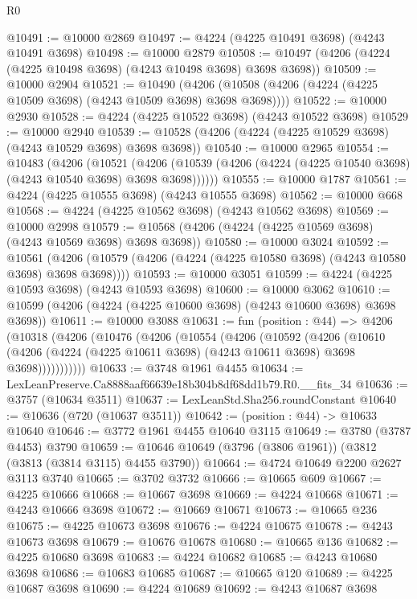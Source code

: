 \begin{lexlean}{R0}
\begin{coremodule}
@10491 := @10000 @2869
@10497 := @4224 (@4225 @10491 @3698) (@4243 @10491 @3698)
@10498 := @10000 @2879
@10508 := @10497 (@4206 (@4224 (@4225 @10498 @3698) (@4243 @10498 @3698) @3698 @3698))
@10509 := @10000 @2904
@10521 := @10490
    (@4206 (@10508 (@4206 (@4224 (@4225 @10509 @3698) (@4243 @10509 @3698) @3698 @3698))))
@10522 := @10000 @2930
@10528 := @4224 (@4225 @10522 @3698) (@4243 @10522 @3698)
@10529 := @10000 @2940
@10539 := @10528 (@4206 (@4224 (@4225 @10529 @3698) (@4243 @10529 @3698) @3698 @3698))
@10540 := @10000 @2965
@10554 := @10483
    (@4206
      (@10521
        (@4206 (@10539 (@4206 (@4224 (@4225 @10540 @3698) (@4243 @10540 @3698) @3698 @3698))))))
@10555 := @10000 @1787
@10561 := @4224 (@4225 @10555 @3698) (@4243 @10555 @3698)
@10562 := @10000 @668
@10568 := @4224 (@4225 @10562 @3698) (@4243 @10562 @3698)
@10569 := @10000 @2998
@10579 := @10568 (@4206 (@4224 (@4225 @10569 @3698) (@4243 @10569 @3698) @3698 @3698))
@10580 := @10000 @3024
@10592 := @10561
    (@4206 (@10579 (@4206 (@4224 (@4225 @10580 @3698) (@4243 @10580 @3698) @3698 @3698))))
@10593 := @10000 @3051
@10599 := @4224 (@4225 @10593 @3698) (@4243 @10593 @3698)
@10600 := @10000 @3062
@10610 := @10599 (@4206 (@4224 (@4225 @10600 @3698) (@4243 @10600 @3698) @3698 @3698))
@10611 := @10000 @3088
@10631 := fun (position : @44) =>
  @4206
    (@10318
      (@4206
        (@10476
          (@4206
            (@10554
              (@4206
                (@10592
                  (@4206
                    (@10610
                      (@4206 (@4224 (@4225 @10611 @3698) (@4243 @10611 @3698) @3698 @3698)))))))))))
@10633 := @3748 @1961 @4455
@10634 := LexLeanPreserve.Ca8888aaf66639e18b304b8df68dd1b79.R0.__fits_34
@10636 := @3757 (@10634 @3511)
@10637 := LexLeanStd.Sha256.roundConstant
@10640 := @10636 (@720 (@10637 @3511))
@10642 := (position : @44) -> @10633 @10640
@10646 := @3772 @1961 @4455 @10640 @3115
@10649 := @3780 (@3787 @4453) @3790
@10659 := @10646 @10649 (@3796 (@3806 @1961)) (@3812 (@3813 (@3814 @3115) @4455 @3790))
@10664 := @4724 @10649 @2200 @2627 @3113 @3740
@10665 := @3702 @3732
@10666 := @10665 @609
@10667 := @4225 @10666
@10668 := @10667 @3698
@10669 := @4224 @10668
@10671 := @4243 @10666 @3698
@10672 := @10669 @10671
@10673 := @10665 @236
@10675 := @4225 @10673 @3698
@10676 := @4224 @10675
@10678 := @4243 @10673 @3698
@10679 := @10676 @10678
@10680 := @10665 @136
@10682 := @4225 @10680 @3698
@10683 := @4224 @10682
@10685 := @4243 @10680 @3698
@10686 := @10683 @10685
@10687 := @10665 @120
@10689 := @4225 @10687 @3698
@10690 := @4224 @10689
@10692 := @4243 @10687 @3698

\end{coremodule}
\end{lexlean}
